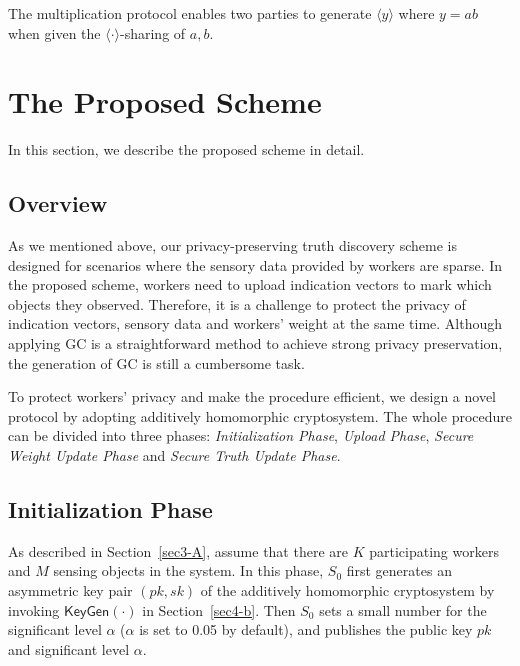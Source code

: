 \documentclass[conference]{IEEEtran}
\begin{document}
The multiplication protocol enables two parties to generate $\langle y \rangle$ where $y = ab$ when given the $\langle \cdot \rangle$-sharing of $a,b$.
\fi


\section{The Proposed Scheme}\label{sec5}

In this section, we describe the proposed scheme in detail.

\subsection{Overview}

As we mentioned above, our privacy-preserving truth discovery scheme is designed for scenarios where the sensory data provided by workers are sparse.
In the proposed scheme, workers need to upload indication vectors to mark which objects they observed.
Therefore, it is a challenge to protect the privacy of indication vectors, sensory data and workers' weight at the same time.
Although applying GC is a straightforward method to achieve strong privacy preservation, the generation of GC is still a cumbersome task.

To protect workers' privacy and make the procedure efficient, we design a novel protocol by adopting additively homomorphic cryptosystem.
The whole procedure can be divided into three phases: {\em Initialization Phase}, {\em Upload Phase}, {\em Secure Weight Update Phase} and {\em Secure Truth Update Phase}.

\subsection{Initialization Phase}

As described in Section~\ref{sec3-A}, assume that there are $K$ participating workers and $M$ sensing objects in the system.
In this phase, $S_0$ first generates an asymmetric key pair $(pk, sk)$ of the additively homomorphic cryptosystem by invoking $\mathsf{KeyGen}(\cdot)$ in Section~\ref{sec4-b}.
Then $S_0$ sets a small number for the significant level $\alpha$ ($\alpha$ is set to 0.05 by default), and publishes the public key $pk$ and significant level $\alpha$.

\end{document}
